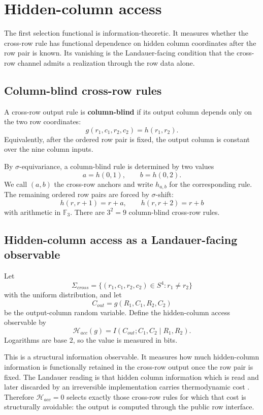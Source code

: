 \documentclass[11pt]{article}
\theoremstyle{definition}
\begin{document}
\section{Hidden-column access}\label{hidden-column-access}

The first selection functional is information-theoretic. It measures
whether the cross-row rule has functional dependence on hidden column
coordinates after the row pair is known. Its vanishing is the
Landauer-facing condition that the cross-row channel admits a
realization through the row data alone.

\subsection{Column-blind cross-row
rules}\label{column-blind-cross-row-rules}

A cross-row output rule is \textbf{column-blind} if its output column
depends only on the two row coordinates: \[
g(r_1,c_1,r_2,c_2)=h(r_1,r_2).
\] Equivalently, after the ordered row pair is fixed, the output column
is constant over the nine column inputs.

By \(\sigma\)-equivariance, a column-blind rule is determined by two
values \[
a=h(0,1),
\qquad
b=h(0,2).
\] We call \((a,b)\) the cross-row anchors and write \(h_{a,b}\) for the
corresponding rule. The remaining ordered row pairs are forced by
\(\sigma\)-shift: \[
h(r,r+1)=r+a,
\qquad
h(r,r+2)=r+b
\] with arithmetic in \(\mathbb F_3\). There are \(3^2=9\) column-blind
cross-row rules.

\subsection{Hidden-column access as a Landauer-facing
observable}\label{hidden-column-access-as-a-landauer-facing-observable}

Let \[
\Sigma_{cross}=\{(r_1,c_1,r_2,c_2)\in S^4:r_1\ne r_2\}
\] with the uniform distribution, and let \[
C_{out}=g(R_1,C_1,R_2,C_2)
\] be the output-column random variable. Define the hidden-column access
observable by \[
\boxed{
\mathcal H_{acc}(g)=I(C_{out};C_1,C_2\mid R_1,R_2).
}
\] Logarithms are base \(2\), so the value is measured in bits.

This is a structural information observable. It measures how much
hidden-column information is functionally retained in the cross-row
output once the row pair is fixed. The Landauer reading is that hidden
column information which is read and later discarded by an irreversible
implementation carries thermodynamic cost
\cite{Landauer1961,Bennett1973,Bennett1982}. Therefore
\(\mathcal H_{acc}=0\) selects exactly those cross-row rules for which
that cost is structurally avoidable: the output is computed through
the public row interface.
\end{document}
